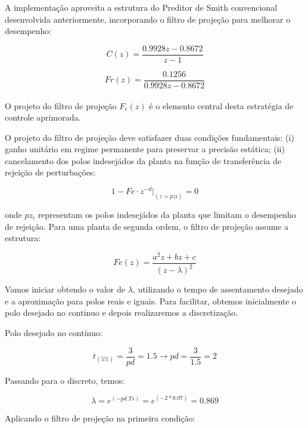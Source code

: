 \documentclass[a4paper,12pt]{article}
\begin{document}
A implementação aproveita a estrutura do Preditor de Smith convencional desenvolvida anteriormente, incorporando o filtro de projeção para melhorar o desempenho:

\begin{equation}
C(z) = \frac{0.9928z - 0.8672}{z - 1}
\end{equation}

\begin{equation}
Fr(z) = \frac{0.1256}{0.9928z - 0.8672}
\end{equation}\\

O projeto do filtro de projeção $F_e(z)$ é o elemento central desta estratégia de controle aprimorada.


O projeto do filtro de projeção deve satisfazer duas condições fundamentais: (i) ganho unitário em regime permanente para preservar a precisão estática; (ii) cancelamento dos polos indesejádos da planta na função de transferência de rejeição de perturbações:

\begin{equation}
1 - Fe \cdot z^{-d} |_{(z=pzi)} = 0 
\end{equation}

onde $pz_i$ representam os polos indesejádos da planta que limitam o desempenho de rejeição. Para uma planta de segunda ordem, o filtro de projeção assume a estrutura:

\begin{equation}
Fe(z) = \frac{a^2z+bz+c}{(z-\lambda)^2}
\end{equation}


Vamos iniciar obtendo o valor de $\lambda$, utilizando o tempo de assentamento desejado e a aproximação para polos reais e iguais. Para facilitar, obtemos inicialmente o polo desejado  no continuo e depois realizaremos a discretização.


Polo desejado no contínuo:

\begin{equation}
t_{(5\%)} = \frac{3}{pd} = 1.5 \xrightarrow{} pd = \frac{3}{1.5} = 2
\end{equation}

Passando para o discreto, temos:

\begin{equation}
\lambda = e^{(-pd.Ts)} = e^{(-2*0.07)} = 0.869
\end{equation}

Aplicando o filtro de projeção na primeira condição:
\end{document}
